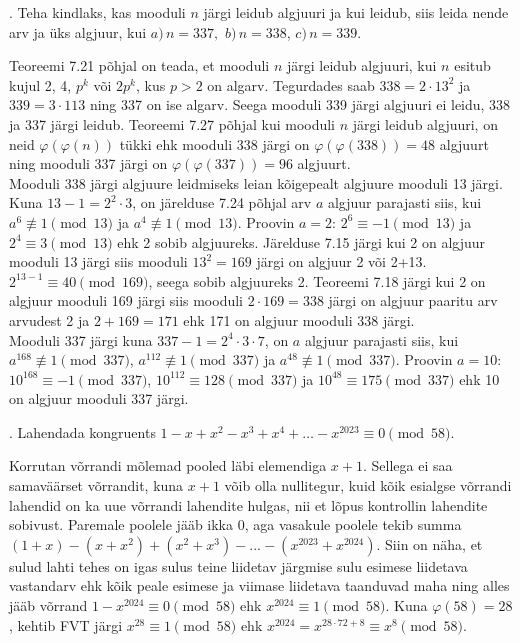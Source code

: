 \documentclass[a4paper, 10pt]{article}
\begin{document}
. Teha kindlaks, kas mooduli $n$ järgi leidub algjuuri ja kui leidub, siis leida nende arv ja üks algjuur, kui $a)\, n=337,$ $b)\, n=338$, $c)\, n=339$.

\bigskip
Teoreemi 7.21 põhjal on teada, et mooduli $n$ järgi leidub algjuuri, kui $n$ esitub kujul 2, 4, $p^k$ või $2p^k$, kus $p>2$ on algarv. Tegurdades saab $338=2\cdot13^2$ ja $339=3\cdot113$ ning 337 on ise algarv. Seega mooduli 339 järgi algjuuri ei leidu, 338 ja 337 järgi leidub. Teoreemi 7.27 põhjal kui mooduli $n$ järgi leidub algjuuri, on neid $\varphi(\varphi(n))$ tükki ehk mooduli 338 järgi on $\varphi(\varphi(338))=48$ algjuurt ning mooduli 337 järgi on $\varphi(\varphi(337))=96$ algjuurt.\\
Mooduli 338 järgi algjuure leidmiseks leian kõigepealt algjuure mooduli 13 järgi. Kuna $13-1=2^2\cdot3$, on järelduse 7.24 põhjal arv $a$ algjuur parajasti siis, kui $a^{6}\not\equiv1\pmod{13}$ ja $a^4\not\equiv1\pmod{13}$. Proovin $a=2$: $2^{6}\equiv-1\pmod{13}$ ja $2^{4}\equiv3\pmod{13}$ ehk 2 sobib algjuureks. Järelduse 7.15 järgi kui 2 on algjuur mooduli 13 järgi siis mooduli $13^2=169$ järgi on algjuur 2 või 2+13. $2^{13-1}\equiv 40\pmod{169}$, seega sobib algjuureks 2. Teoreemi 7.18 järgi kui 2 on algjuur mooduli 169 järgi siis mooduli $2\cdot169=338$ järgi on algjuur paaritu arv arvudest 2 ja $2+169=171$ ehk 171 on algjuur mooduli 338 järgi.\\
Mooduli 337 järgi kuna $337-1=2^4\cdot3\cdot7$, on $a$ algjuur parajasti siis, kui \mbox{$a^{168}\not\equiv1\pmod{337}$}, \mbox{$a^{112}\not\equiv1\pmod{337}$} ja \mbox{$a^{48}\not\equiv1\pmod{337}$}. Proovin $a=10$: $10^{168}\equiv-1\pmod{337}$, $10^{112}\equiv128\pmod{337}$ ja $10^{48}\equiv175\pmod{337}$ ehk 10 on algjuur mooduli 337 järgi.


\bigskip
\pagebreak

. Lahendada kongruents $1-x+x^2-x^3+x^4+\ldots-x^{2023} \equiv 0 \pmod{58}$. 

\bigskip
Korrutan võrrandi mõlemad pooled läbi elemendiga $x+1$. Sellega ei saa samaväärset võrrandit, kuna $x+1$ võib olla nullitegur, kuid kõik esialgse võrrandi lahendid on ka uue võrrandi lahendite hulgas, nii et lõpus kontrollin lahendite sobivust. Paremale poolele jääb ikka 0, aga vasakule poolele tekib summa $(1+x)-(x+x^2)+(x^2+x^3)-...-(x^{2023}+x^{2024})$. Siin on näha, et sulud lahti tehes on igas sulus teine liidetav järgmise sulu esimese liidetava vastandarv ehk kõik peale esimese ja viimase liidetava taanduvad maha ning alles jääb võrrand $1-x^{2024}\equiv0\pmod{58}$ ehk $x^{2024}\equiv1\pmod{58}$. Kuna $\varphi(58)=28$, kehtib FVT järgi $x^{28}\equiv1\pmod{58}$ ehk $x^{2024}=x^{28\cdot72+8}\equiv x^8\pmod{58}$.
\end{document}
